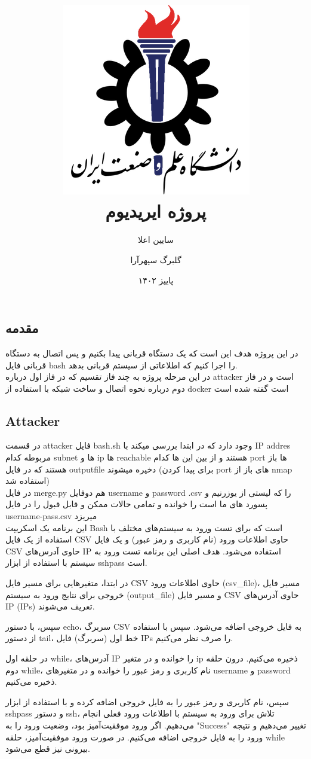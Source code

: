 \documentclass[oneside]{report}
\title{
    \includegraphics[width=0.5\linewidth]{3.png}
    \\
    پروژه ایریدیوم
}
\author{سایین اعلا \\ \and گلبرگ سپهرآرا}
\date{پاییز ۱۴۰۲}
\begin{document}
\maketitle

\subsection*{مقدمه}
در این پروژه هدف این است که یک دستگاه قربانی پیدا بکنیم و پس اتصال به دستگاه قربانی فایل bash  را اجرا کنیم که اطلاعاتی از سیستم قربانی بدهد.
\\
در این مرحله پروژه به چند فاز تقسیم که در فاز اول درباره attacker  است و در فاز دوم درباره نحوه اتصال و ساخت شبکه با استفاده از docker است گفته شده است

\subsection*{Attacker}
در قسمت attacker فایل bash.sh  وجود دارد که در ابتدا بررسی میکند با IP addres مربوطه کدام subnet  ها و  ip  ها reachable  هستند و از بین این ها کدام  port  ها باز هستند که در فایل outputfile  دخیره میشوند
(برای پیدا کردن port  های باز  از nmap استفاده شد)
\\
در فایل merge.py  هم دوفایل username  و  password .csv  را که لیستی از یوزرنیم و پسورد های ما است را خوانده
و تمامی حالات ممکن و قابل قبول را در فایل username-pass.csv  میریزد
\\
این برنامه یک اسکریپت Bash است که برای تست ورود به سیستم‌های مختلف با استفاده از یک فایل CSV حاوی اطلاعات ورود (نام کاربری و رمز عبور) و یک فایل CSV حاوی آدرس‌های IP استفاده می‌شود. هدف اصلی این برنامه تست ورود به سیستم با استفاده از ابزار sshpass است.

در ابتدا، متغیرهایی برای مسیر فایل CSV حاوی اطلاعات ورود (csv_file)، مسیر فایل خروجی برای نتایج ورود به سیستم (output_file) و مسیر فایل CSV حاوی آدرس‌های IP (IPs) تعریف می‌شوند.

سپس، با دستور echo، سربرگ CSV به فایل خروجی اضافه می‌شود. سپس با استفاده از دستور tail، خط اول (سربرگ) فایل IPs را صرف نظر می‌کنیم.

در حلقه اول while، آدرس‌های IP را خوانده و در متغیر ip ذخیره می‌کنیم. درون حلقه دوم while، نام کاربری و رمز عبور را خوانده و در متغیرهای username و password ذخیره می‌کنیم.

سپس، نام کاربری و رمز عبور را به فایل خروجی اضافه کرده و با استفاده از ابزار sshpass و دستور ssh، تلاش برای ورود به سیستم با اطلاعات ورود فعلی انجام می‌دهیم. اگر ورود موفقیت‌آمیز بود، وضعیت ورود را به "Success" تغییر می‌دهیم و نتیجه ورود را به فایل خروجی اضافه می‌کنیم. در صورت ورود موفقیت‌آمیز، حلقه while بیرونی نیز قطع می‌شود.
\end{document}
